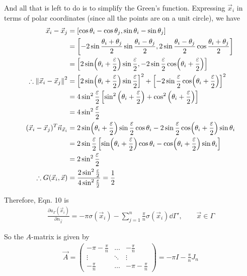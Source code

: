 \begin{enumerate}[label=(\alph*),leftmargin=*,itemsep=0mm]
    And all that is left to do is to simplify the Green's function.  Expressing $\vec{x}_i$ in terms of polar coordinates (since all the points are on a unit circle), we have
    \begin{align*}
        \vec{x}_i-\vec{x}_j &= [\cos\theta_i - \cos\theta_j, \sin\theta_i-\sin\theta_j] \\
        &= \left[ -2\sin\frac{\theta_i+\theta_j}{2}\sin\frac{\theta_i-\theta_j}{2},
        2\sin\frac{\theta_i-\theta_j}{2}\cos\frac{\theta_i+\theta_j}{2} \right] \\
        &= \left[ 2\sin(\theta_i+\frac{\varepsilon}{2})\sin\frac{\varepsilon}{2},
        -2\sin\frac{\varepsilon}{2}\cos(\theta_i+\frac{\varepsilon}{2}) \right] \\
        \therefore \norm{\vec{x}_i-\vec{x}_j}^2
        &= \left[ 2\sin(\theta_i+\frac{\varepsilon}{2})\sin\frac{\varepsilon}{2} \right]^2
        + \left[ -2\sin\frac{\varepsilon}{2}\cos(\theta_i+\frac{\varepsilon}{2}) \right]^2 \\
        &= 4\sin^2\frac{\varepsilon}{2}
        \left[ \sin^2\left(\theta_i+\frac{\varepsilon}{2}\right)
        + \cos^2\left(\theta_i+\frac{\varepsilon}{2}\right) \right] \\
        &= 4\sin^2\frac{\varepsilon}{2} \\
        (\vec{x}_i-\vec{x}_j)^T \vec{n}_{\vec{x}_i}
        &= 2\sin(\theta_i+\frac{\varepsilon}{2})\sin\frac{\varepsilon}{2}\cos\theta_i
        - 2\sin\frac{\varepsilon}{2}\cos(\theta_i+\frac{\varepsilon}{2})\sin\theta_i \\
        &= 2\sin\frac{\varepsilon}{2} \left[ \sin(\theta_i+\frac{\varepsilon}{2})\cos\theta_i
        - \cos(\theta_i+\frac{\varepsilon}{2})\sin\theta_i\right] \\
        &= 2\sin^2\frac{\varepsilon}{2} \\
        \therefore G(\vec{x}_i,\vec{x})
        &= \frac{2\sin^2\frac{\varepsilon}{2}}{4\sin^2\frac{\varepsilon}{2}}
        = \frac{1}{2}
    \end{align*}
    
    Therefore, Eqn. 10 is
    \begin{align}
        \frac{\partial{u}_\Gamma (\vec{x}_i)}{\partial{n}_{\vec{x}}}
        = -\pi\sigma(\vec{x}_i) - \sum_{j=1}^n \frac{\pi}{n} \sigma(\vec{x}_i) \dd{\Gamma'},
        \qquad \vec{x}\in\Gamma
    \end{align}
    
    So the $A$-matrix is given by
    \begin{align}
        \vec{A} = \begin{pmatrix} -\pi - \frac{\pi}{n} & \dots & -\frac{\pi}{n} \\
        \vdots & \ddots & \vdots \\
        -\frac{\pi}{n} & \dots & -\pi -\frac{\pi}{n} \end{pmatrix}
        = -\pi I - \frac{\pi}{n} J_n
    \end{align}
    

\end{enumerate}
